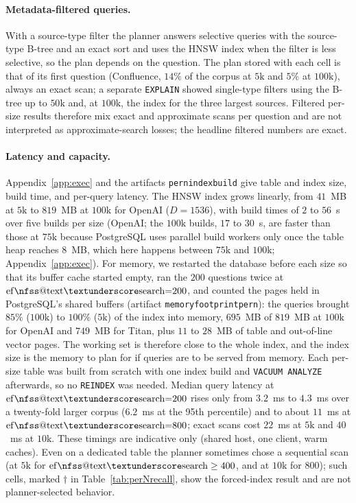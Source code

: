 \documentclass{ieeeaccess}
\makeatletter
\DeclareRobustCommand{\_}{\ifmmode\nfss@text{\textunderscore}\else\textunderscore\allowbreak\fi}
\makeatother
\begin{document}
\paragraph{Metadata-filtered queries.}
With a source-type filter the planner answers selective queries with the source-type B-tree and an exact sort and uses the HNSW index when the filter is less selective, so the plan depends on the question. The plan stored with each cell is that of its first question (Confluence, $14\%$ of the corpus at $5\text{k}$ and $5\%$ at $100\text{k}$), always an exact scan; a separate \texttt{EXPLAIN} showed single-type filters using the B-tree up to $50\text{k}$ and, at $100\text{k}$, the index for the three largest sources. Filtered per-size results therefore mix exact and approximate scans per question and are not interpreted as approximate-search losses; the headline filtered numbers are exact.

\paragraph{Latency and capacity.}
Appendix~\ref{app:exec} and the artifacts \texttt{per\_n\_index\_build\_*} give table and index size, build time, and per-query latency. The HNSW index grows linearly, from $41$~MB at $5\text{k}$ to $819$~MB at $100\text{k}$ for OpenAI ($D{=}1536$), with build times of $2$ to $56$~s over five builds per size (OpenAI; the $100\text{k}$ builds, $17$ to $30$~s, are faster than those at $75\text{k}$ because PostgreSQL uses parallel build workers only once the table heap reaches $8$~MB, which here happens between $75\text{k}$ and $100\text{k}$; Appendix~\ref{app:exec}). For memory, we restarted the database before each size so that its buffer cache started empty, ran the $200$ questions twice at $\mathrm{ef\_search}{=}200$, and counted the pages held in PostgreSQL's shared buffers (artifact \texttt{memory\_footprint\_per\_n}): the queries brought $85\%$ ($100\text{k}$) to $100\%$ ($5\text{k}$) of the index into memory, $695$~MB of $819$~MB at $100\text{k}$ for OpenAI and $749$~MB for Titan, plus $11$ to $28$~MB of table and out-of-line vector pages. The working set is therefore close to the whole index, and the index size is the memory to plan for if queries are to be served from memory. Each per-size table was built from scratch with one index build and \texttt{VACUUM ANALYZE} afterwards, so no \texttt{REINDEX} was needed. Median query latency at $\mathrm{ef\_search}{=}200$ rises only from $3.2$~ms to $4.3$~ms over a twenty-fold larger corpus ($6.2$~ms at the 95th percentile) and to about $11$~ms at $\mathrm{ef\_search}{=}800$; exact scans cost $22$~ms at $5\text{k}$ and $40$~ms at $10\text{k}$. These timings are indicative only (shared host, one client, warm caches). Even on a dedicated table the planner sometimes chose a sequential scan (at $5\text{k}$ for $\mathrm{ef\_search}\ge400$, and at $10\text{k}$ for $800$); such cells, marked $\dagger$ in Table~\ref{tab:perNrecall}, show the forced-index result and are not planner-selected behavior.
\end{document}
